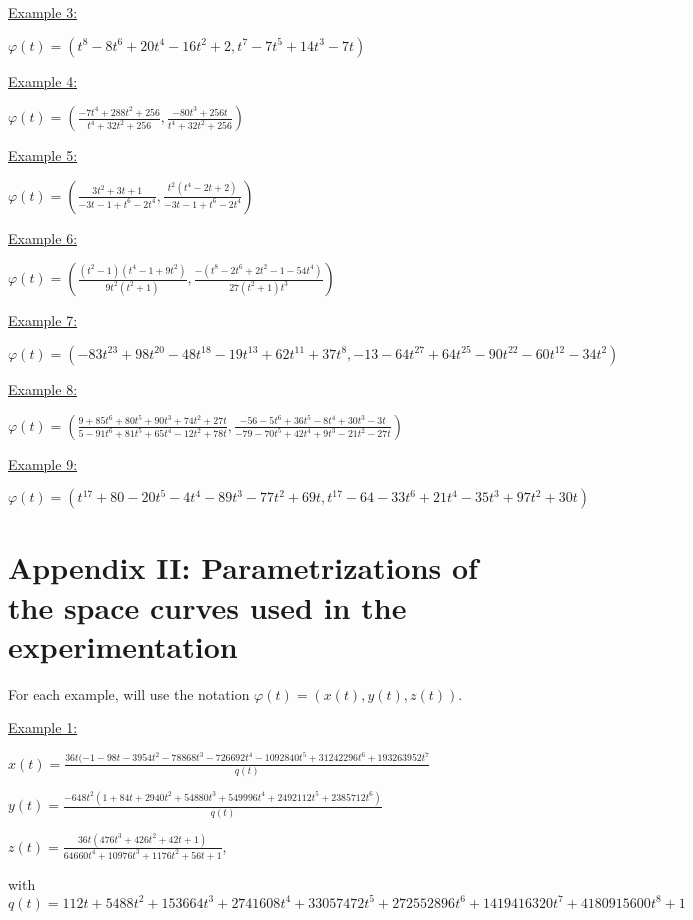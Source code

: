 \documentclass{elsart}
\begin{document}
\underline{Example 3:}

$\varphi(t)=\left(t^8-8t^6+20t^4-16t^2+2,t^7-7t^5+14t^3-7t\right)$

\underline{Example 4:}

$\varphi(t)=\left(\displaystyle{\frac{-7t^4+288t^2+256}{t^4+32t^2+256},\frac{-80t^3+256t}{t^4+32t^2+256}}\right)$


\underline{Example 5:}

$\varphi(t)=\left(\displaystyle{\frac{3t^2+3t+1}{-3t-1+t^6-2t^4},\frac{t^2(t^4-2t+2)}{-3t-1+t^6-2t^4}}\right)$


\underline{Example 6:}

$\varphi(t)=\left(\displaystyle{\frac{(t^2-1)(t^4-1+9t^2)}{9t^2(t^2+1)},\frac{-(t^8-2t^6+2t^2-1-54t^4)}{27(t^2+1)t^3}}\right)$


\underline{Example 7:}

$\varphi(t)=\left(-83t^{23}+98t^{20}-48t^{18}-19t^{13}+62t^{11}+37t^8,-13-64t^{27}+64t^{25}-90t^{22}-60t^{12}-34t^2\right)$

\underline{Example 8:}

$\varphi(t)=\left(\displaystyle{\frac{9+85t^6+80t^5+90t^3+74t^2+27t}{5-91t^6+81t^5+65t^4-12t^2+78t},
\frac{-56-5t^6+36t^5-8t^4+30t^3-3t}{-79-70t^5+42t^4+9t^3-21t^2-27t}}\right)$

\underline{Example 9:}

$\varphi(t)=\left(t^{17}+80-20t^5-4t^4-89t^3-77t^2+69t,
t^{17}-64-33t^6+21t^4-35t^3+97t^2+30t\right)$


\section*{Appendix II: Parametrizations of the space curves used in
the experimentation}\label{appen-2}

For each example, will use the notation
$\varphi(t)=(x(t),y(t),z(t))$.

\underline{Example 1:}

$x(t)=\displaystyle{\frac{36t(-1-98t-3954t^2-78868t^3-726692t^4-1092840t^5+31242296t^6+193263952t^7}{q(t)}}$

$y(t)=\displaystyle{\frac{-648t^2(1+84t+2940t^2+54880t^3+549996t^4+2492112t^5+2385712t^6)}{q(t)}}$

$z(t)=\displaystyle{\frac{36t(476t^3+426t^2+42t+1)}{64660t^4+10976t^3+1176t^2+56t+1}},$

with
$q(t)=112t+5488t^2+153664t^3+2741608t^4+33057472t^5+272552896t^6+1419416320t^7+4180915600t^8+1$
\end{document}
